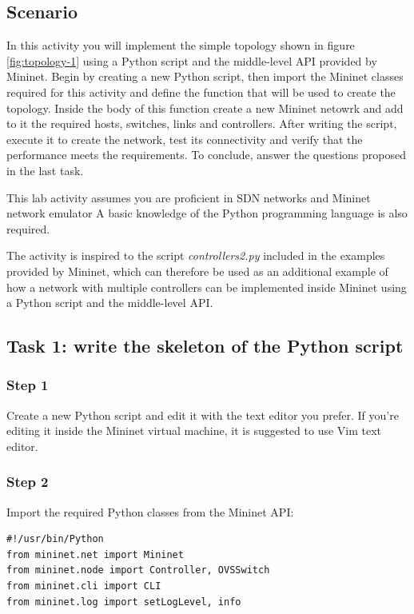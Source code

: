 \subsection*{Scenario}
In this activity you will implement the simple topology shown in figure \ref{fig:topology-1} using
a Python script and the middle-level API provided by Mininet.
Begin by creating a new Python script, then import the Mininet classes required for
this activity and define the function that will be used to create the topology.
Inside the body of this function create a new Mininet netowrk and add to it the
required hosts, switches, links and controllers. After writing the script, execute
it to create the network, test its connectivity and verify that the performance
meets the requirements. To conclude, answer the questions proposed in the last task.

This lab activity assumes you are proficient in SDN networks and Mininet network
emulator %
A basic knowledge of the Python programming language is also required.

The activity is inspired to the script \textit{controllers2.py} \cite{ref-3} included in the
examples provided by Mininet, which can therefore be used as
an additional example of how a network with multiple controllers can be implemented
inside Mininet using a Python script and the middle-level API.




\subsection*{Task 1: write the skeleton of the Python script}
\subsubsection*{Step 1}
Create a new Python script and edit it with the text editor you prefer. If you're editing
it inside the Mininet virtual machine, it is suggested to use Vim text editor.

\subsubsection*{Step 2}
Import the required Python classes from the Mininet API:
\begin{lstlisting}
#!/usr/bin/Python
from mininet.net import Mininet
from mininet.node import Controller, OVSSwitch
from mininet.cli import CLI
from mininet.log import setLogLevel, info
\end{lstlisting}

